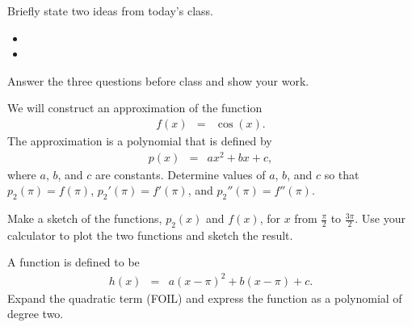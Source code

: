 \postClass

\begin{problem}
\item Briefly state two ideas from today's class.
  \begin{itemize}
  \item
  \item
  \end{itemize}
\item
  \begin{subproblem}
    \item
  \end{subproblem}
\end{problem}



Answer the three questions before class and show your work.

\begin{problem}
\item We will construct an approximation of the function
  \begin{eqnarray*}
    f(x) & = & \cos(x).
  \end{eqnarray*}
  The approximation is a polynomial that is defined by
  \begin{eqnarray*}
    p(x) & = & a x^2 + b x + c,
  \end{eqnarray*}
  where $a$, $b$, and $c$ are constants.
  Determine values of $a$, $b$, and $c$ so that $p_2(\pi)=f(\pi)$,
  $p_2'(\pi)=f'(\pi)$, and $p_2''(\pi)=f''(\pi)$.
  \vfill

  \clearpage

\item Make a sketch of the functions, $p_2(x)$ and $f(x)$, for $x$ from $\frac{\pi}{2}$ to
  $\frac{3\pi}{2}$. Use your calculator to plot the two functions and
  sketch the result.

  \vfill

\item A function is defined to be
  \begin{eqnarray*}
    h(x) & = & a (x-\pi)^2 + b (x-\pi) + c.
  \end{eqnarray*}
  Expand the quadratic term (FOIL) and express the function as a
  polynomial of degree two.

  \vspace{5em}


\end{problem}


